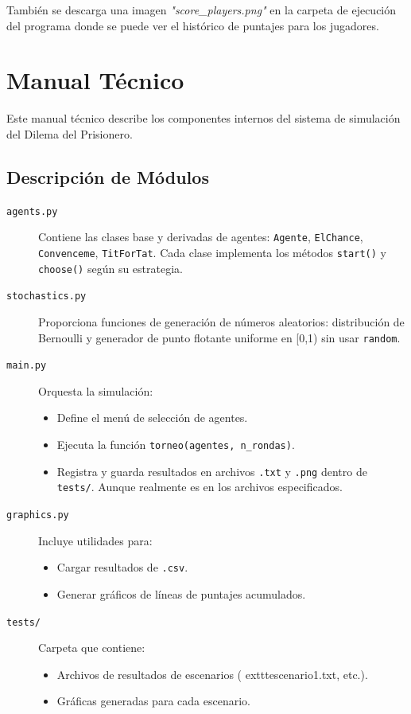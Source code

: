 \documentclass{article}
\begin{document}
También se descarga una imagen \textit{"score\_players.png"} en la carpeta
de ejecución del programa donde se puede ver el histórico de
puntajes para los jugadores.


\section{Manual Técnico}\label{sec:man_t}


Este manual técnico describe los componentes internos del sistema 
de simulación del Dilema del Prisionero.

\subsection{Descripción de Módulos}
\begin{description}
  \item[\texttt{agents.py}] Contiene las clases base y derivadas de agentes:
    \texttt{Agente}, \texttt{ElChance}, \texttt{Convenceme}, \texttt{TitForTat}. Cada clase implementa los métodos \texttt{start()} y \texttt{choose()} según su estrategia.
  \item[\texttt{stochastics.py}] Proporciona funciones de generación de números aleatorios:
    distribución de Bernoulli y generador de punto flotante uniforme en [0,1) sin usar \texttt{random}.
  \item[\texttt{main.py}] Orquesta la simulación:
    \begin{itemize}
      \item Define el menú de selección de agentes.
      \item Ejecuta la función \texttt{torneo(agentes, n\_rondas)}.
      \item Registra y guarda resultados en archivos \texttt{.txt} y \texttt{.png} dentro de \texttt{tests/}.
            Aunque realmente es en los archivos especificados.
    \end{itemize}
  \item[\texttt{graphics.py}] Incluye utilidades para:
    \begin{itemize}
      \item Cargar resultados de \texttt{.csv}.
      \item Generar gráficos de líneas de puntajes acumulados.
    \end{itemize}
  \item[\texttt{tests/}] Carpeta que contiene:
    \begin{itemize}
      \item Archivos de resultados de escenarios (	exttt{escenario1.txt}, etc.).
      \item Gráficas generadas para cada escenario.
    \end{itemize}
\end{description}
\end{document}

